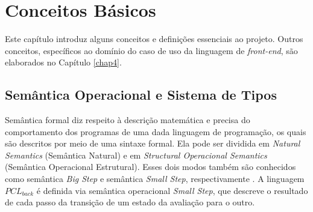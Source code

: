 \chapter{Conceitos Básicos} 
\label{chap2}

Este capítulo introduz alguns conceitos e definições essenciais ao projeto. 
Outros conceitos, específicos ao domínio do caso de uso da linguagem de \emph{front-end},
são elaborados no Capítulo \ref{chap4}. 

\section{Semântica Operacional e Sistema de Tipos}

Semântica formal diz respeito à descrição matemática e precisa do comportamento dos programas de uma dada linguagem de programação, os quais são descritos por meio de uma sintaxe formal. Ela pode ser dividida em \emph{Natural Semantics} (Semântica Natural) e em \emph{Structural Operacional Semantics} (Semântica Operacional Estrutural). Esses dois modos também são conhecidos como semântica \emph{Big Step} e semântica \emph{Small Step}, respectivamente \cite{NIELSON}. A linguagem $PCL_{back}$ é definida via semântica operacional \emph{Small Step}, que descreve o resultado de cada passo da transição de um estado da avaliação para o outro.


